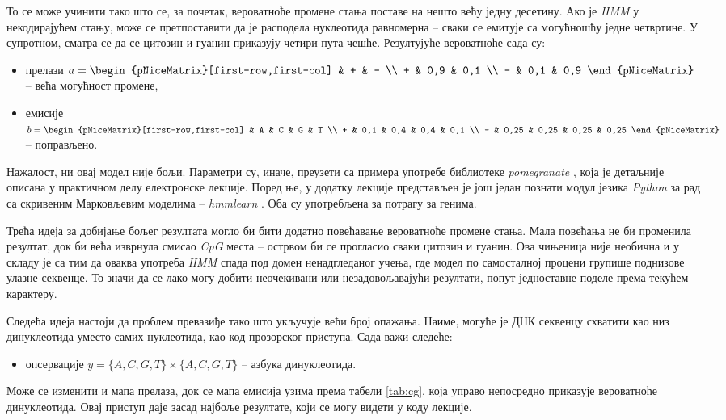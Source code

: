 \documentclass[12pt,oneside]{memoir}
\begin{document}
\begin{CJK}{UTF8}{ipxm}
То се може учинити тако што се, за почетак, вероватноће промене стања поставе на нешто већу једну десетину. Ако је \textit{HMM} у некодирајућем стању, може се претпоставити да је расподела нуклеотида равномерна -- сваки се емитује са могућношћу једне четвртине. У супротном, сматра се да се цитозин и гуанин приказују четири пута чешће. Резултујуће вероватноће сада су:
\begin{itemize}
  \item прелази $a = \begin{pNiceMatrix}[first-row,first-col] & + & - \\ + & 0,9 & 0,1 \\ - & 0,1 & 0,9 \end{pNiceMatrix}$ -- већа могућност промене,
  \item емисије $b = \begin{pNiceMatrix}[first-row,first-col] & A & C & G & T \\ + & 0,1 & 0,4 & 0,4 & 0,1 \\ - & 0,25 & 0,25 & 0,25 & 0,25 \end{pNiceMatrix}$ -- поправљено.
\end{itemize}

Нажалост, ни овај модел није бољи. Параметри су, иначе, преузети са примера употребе библиотеке \textit{pomegranate} \cite{schreiber2021}, која је детаљније описана у практичном делу електронске лекције. Поред ње, у додатку лекције представљен је још један познати модул језика \textit{Python} за рад са скривеним Марковљевим моделима -- \textit{hmmlearn} \cite{lee2021}. Оба су употребљена за потрагу за генима.

Трећа идеја за добијање бољег резултата могло би бити додатно повећавање вероватноће промене стања. Мала повећања не би променила резултат, док би већа изврнула смисао \textit{CpG} места -- острвом би се прогласио сваки цитозин и гуанин. Ова чињеница није необична и у складу је са тим да оваква употреба \textit{HMM} спада под домен ненадгледаног учења, где модел по самосталној процени групише поднизове улазне секвенце. То значи да се лако могу добити неочекивани или незадовољавајући резултати, попут једноставне поделе према текућем карактеру.

Следећа идеја настоји да проблем превазиђе тако што укључује већи број опажања. Наиме, могуће је ДНК секвенцу схватити као низ динуклеотида уместо самих нуклеотида, као код прозорског приступа. Сада важи следеће:
\begin{itemize}
  \item опсервације $y = \{A, C, G, T\} \times \{A, C, G, T\}$ -- азбука динуклеотида.
\end{itemize}
Може се изменити и мапа прелаза, док се мапа емисија узима према табели \ref{tab:cg}, која управо непосредно приказује вероватноће динуклеотида. Овај приступ даје засад најбоље резултате, који се могу видети у коду лекције.


\end{CJK}
\end{document}
